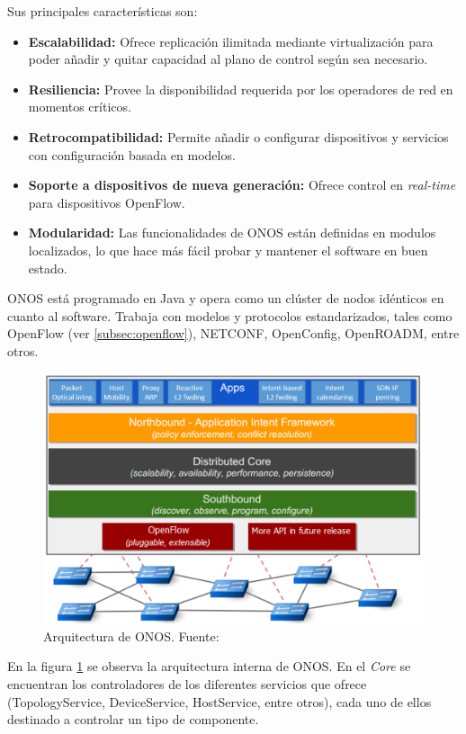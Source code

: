 Sus principales características son:
\begin{itemize}
	\item \textbf{Escalabilidad:} Ofrece replicación ilimitada mediante virtualización para poder añadir y quitar capacidad al plano de control según sea necesario.
	
	\item \textbf{Resiliencia:} Provee la disponibilidad requerida por los operadores de red en momentos críticos.
	
	\item \textbf{Retrocompatibilidad:} Permite añadir o configurar dispositivos y servicios con configuración basada en modelos.
	
	\item \textbf{Soporte a dispositivos de nueva generación:} Ofrece control en \textit{real-time} para dispositivos OpenFlow.
	
	\item \textbf{Modularidad:} Las funcionalidades de \ac{ONOS} están definidas en modulos localizados, lo que hace más fácil probar y mantener el software en buen estado.
\end{itemize}


\ac{ONOS} está programado en Java y opera como un clúster de nodos idénticos en cuanto al software. Trabaja con modelos y protocolos estandarizados, tales como OpenFlow (ver \ref{subsec:openflow}), NETCONF, OpenConfig, OpenROADM, entre otros.

\clearpage


\begin{figure}[!ht]
	\centering
	\includegraphics[width=0.7\linewidth]{imagenes/onos_architecture}
	\caption{Arquitectura de ONOS. 
		Fuente: \cite{onostutbib}}
	\label{fig:onosarch}
\end{figure}

En la figura \ref{fig:onosarch} se observa la arquitectura interna de \ac{ONOS}. En el \textit{Core} se encuentran los controladores de los diferentes servicios que ofrece (TopologyService, DeviceService, HostService, entre otros), cada uno de ellos destinado a controlar un tipo de componente.


